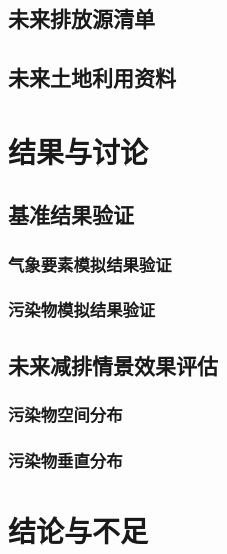 \documentclass[a4paper]{article}
\begin{document}
 \subsection{未来排放源清单}
 \subsection{未来土地利用资料}

\section{结果与讨论}
\subsection{基准结果验证}
\subsubsection{气象要素模拟结果验证}
\subsubsection{污染物模拟结果验证}
\subsection{未来减排情景效果评估}
\subsubsection{污染物空间分布}
\subsubsection{污染物垂直分布}
\section{结论与不足}
\end{document}
